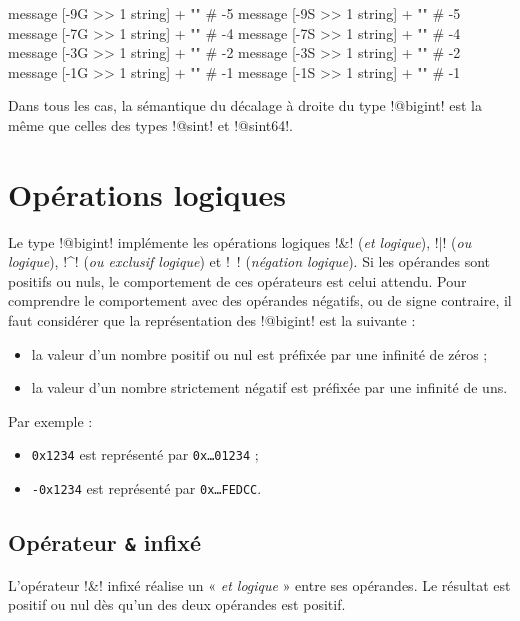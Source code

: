 \begin{galgas}
  message [-9G >> 1 string] + "\n" # -5
  message [-9S >> 1 string] + "\n" # -5
  message [-7G >> 1 string] + "\n" # -4
  message [-7S >> 1 string] + "\n" # -4
  message [-3G >> 1 string] + "\n" # -2
  message [-3S >> 1 string] + "\n" # -2
  message [-1G >> 1 string] + "\n" # -1
  message [-1S >> 1 string] + "\n" # -1
\end{galgas}

Dans tous les cas, la sémantique du décalage à droite du type \ggs!@bigint! est la même que celles des types \ggs!@sint! et \ggs!@sint64!.










\section{Opérations logiques}

Le type \ggs!@bigint! implémente les opérations logiques \ggs!&! (\emph{et logique}), \ggs!|! (\emph{ou logique}), \ggs!^! (\emph{ou exclusif logique}) et \ggs!~! (\emph{négation logique}). Si les opérandes sont positifs ou nuls, le comportement de ces opérateurs est celui attendu. Pour comprendre le comportement avec des opérandes négatifs, ou de signe contraire, il faut considérer que la représentation des \ggs!@bigint! est la suivante :
\begin{itemize}
  \item la valeur d'un nombre positif ou nul est préfixée par une infinité de zéros ;
  \item la valeur d'un nombre strictement négatif est préfixée par une infinité de uns.
\end{itemize}

Par exemple :
\begin{itemize}
  \item \texttt{0x1234} est représenté par \texttt{0x…01234} ;
  \item \texttt{-0x1234} est représenté par \texttt{0x…FEDCC}.
\end{itemize}


\subsection{Opérateur \texttt{\&} infixé}

L'opérateur \ggs!&! infixé réalise un « \emph{et logique} » entre ses opérandes. Le résultat est positif ou nul dès qu'un des deux opérandes est positif.

